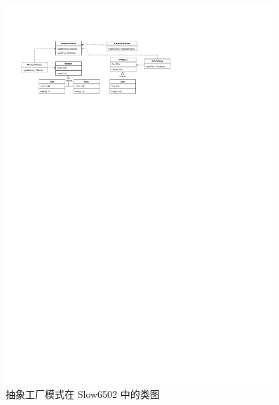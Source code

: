 \begin{figure}[h]
  \centering
  \includegraphics[width=0.9\textwidth]{figures/抽象工厂.pdf}
  \caption{抽象工厂模式在 Slow6502 中的类图}
\end{figure}
